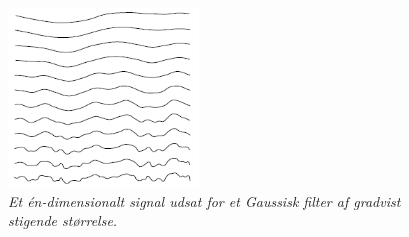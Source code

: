 \begin{figure}[H]
    \centering
    \includegraphics[width=0.45\textwidth]{fig/33.png}
     \vspace{-1em}
    \begin{center}    
       \caption{{\footnotesize \textit{Et én-dimensionalt signal udsat for et Gaussisk filter af gradvist stigende størrelse.}}}
    \label{fig:scalereps}
     \end{center}
     \vspace{-2.5em}
  \end{figure} \noindent
